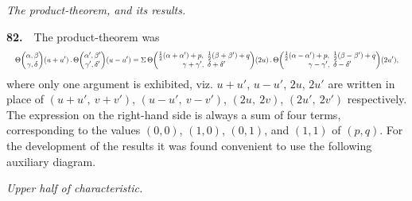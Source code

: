 \documentclass[11pt]{article}
\begin{document}
\medskip

\begin{center}
\textit{The product-theorem, and its results.}
\end{center}

\smallskip

\noindent\textbf{82.}\ \ The product-theorem was
\[
\resizebox{\textwidth}{!}{$\displaystyle
\Theta\!\begin{pmatrix}\alpha,\beta\\ \gamma,\delta\end{pmatrix}\!(u+u')\,.\,\Theta\!\begin{pmatrix}\alpha',\beta'\\ \gamma',\delta'\end{pmatrix}\!(u-u') = \Sigma\,\Theta\!\begin{pmatrix}\tfrac{1}{2}(\alpha+\alpha')+p,\ \tfrac{1}{2}(\beta+\beta')+q\\ \gamma+\gamma',\ \delta+\delta'\end{pmatrix}\!(2u)\,.\,\Theta\!\begin{pmatrix}\tfrac{1}{2}(\alpha-\alpha')+p,\ \tfrac{1}{2}(\beta-\beta')+q\\ \gamma-\gamma',\ \delta-\delta'\end{pmatrix}\!(2u'),$}
\]
where only one argument is exhibited, viz. $u+u'$, $u-u'$, $2u$, $2u'$ are written in place of $(u+u',\ v+v')$, $(u-u',\ v-v')$, $(2u,\ 2v)$, $(2u',\ 2v')$ respectively. The expression on the right-hand side is always a sum of four terms, corresponding to the values $(0,0)$, $(1,0)$, $(0,1)$, and $(1,1)$ of $(p,q)$. For the development of the results it was found convenient to use the following auxiliary diagram.

\medskip

\begin{center}
\textit{Upper half of characteristic.}
\end{center}

\medskip
\end{document}
